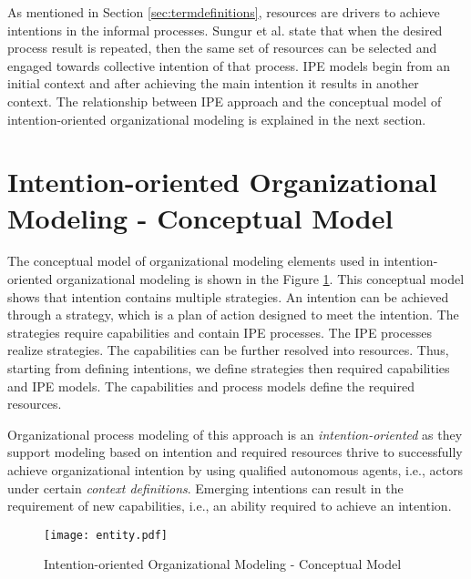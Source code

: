 As mentioned in Section \ref{sec:termdefinitions}, resources are drivers to achieve intentions in the informal processes. Sungur et al. \cite{Sungur2014a} state that when the desired process result is repeated, then the same set of resources can be selected and engaged towards collective intention of that process. IPE models begin from an initial context and after achieving the main intention it results in another context. The relationship between IPE approach and the conceptual model of intention-oriented organizational modeling is explained in the next section.

\section{Intention-oriented Organizational Modeling - Conceptual Model}
\label{sec:entitytypesrepresentation}
The conceptual model of organizational modeling elements used in intention-oriented organizational modeling is shown in the Figure \ref{fig:entitymodel}. This conceptual model shows that intention contains multiple strategies. An intention can be achieved through a strategy, which is a plan of action designed to meet the intention. The strategies require capabilities and contain IPE processes. The IPE processes realize strategies. The capabilities can be further resolved into resources. Thus, starting from defining intentions, we define strategies then required capabilities and IPE models. The capabilities and process models define the required resources. 

Organizational process modeling of this approach is an \textit{intention-oriented} as they support modeling based on intention and required resources thrive to successfully achieve organizational intention by using qualified autonomous agents, i.e., actors under certain \textit{context definitions}. Emerging intentions can result in the requirement of new capabilities, i.e., an ability required to achieve an intention.

\begin{figure}
	\centering
	\texttt{[image: entity.pdf]}
	\caption{Intention-oriented Organizational Modeling - Conceptual Model}
	\label{fig:entitymodel}
\end{figure}

